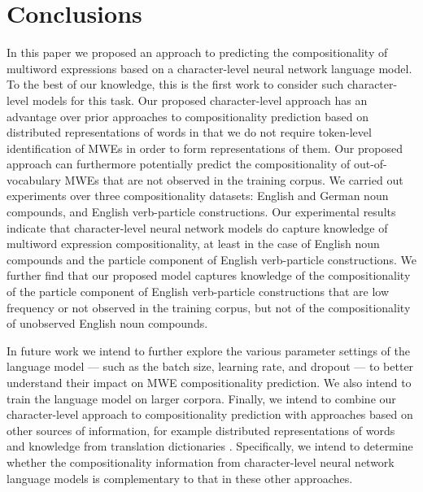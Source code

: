 \documentclass[11pt]{article}
\begin{document}




\section{Conclusions}



In this paper we proposed an approach to predicting the
compositionality of multiword expressions based on a character-level
neural network language model. To the best of our knowledge, this is
the first work to consider such character-level models for this
task. Our proposed character-level approach has an advantage over
prior approaches to compositionality prediction based on distributed
representations of words in that we do not require token-level
identification of MWEs in order to form representations of them. Our
proposed approach can furthermore potentially predict the
compositionality of out-of-vocabulary MWEs that are not observed in
the training corpus. We carried out experiments over three
compositionality datasets: English and German noun compounds, and
English verb-particle constructions. Our experimental results indicate
that character-level neural network models do capture knowledge of
multiword expression compositionality, at least in the case of English
noun compounds and the particle component of English verb-particle
constructions. We further find that our proposed model captures
knowledge of the compositionality of the particle component of English
verb-particle constructions that are low frequency or not observed in
the training corpus, but not of the compositionality of unobserved
English noun compounds.

In future work we intend to further explore the various parameter
settings of the language model --- such as the batch size, learning
rate, and dropout --- to better understand their impact on MWE
compositionality prediction. We also intend to train the language
model on larger corpora. Finally, we intend to combine our
character-level approach to compositionality prediction with
approaches based on other sources of information, for example
distributed representations of words and knowledge from translation
dictionaries \citep{Salehi+:2014a}. Specifically, we intend to
determine whether the compositionality information from
character-level neural network language models is complementary to
that in these other approaches.
\end{document}
